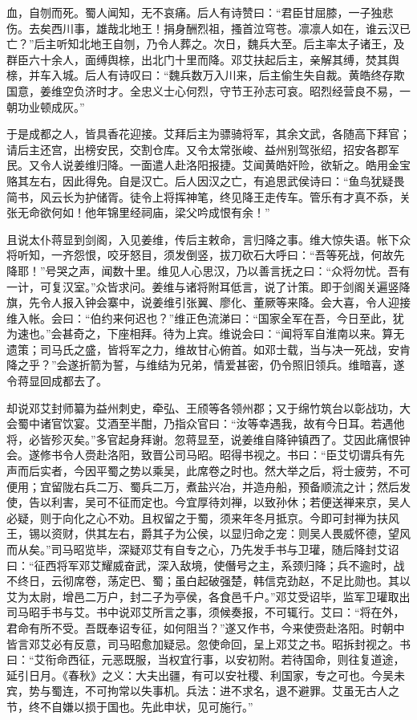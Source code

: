 血，自刎而死。蜀人闻知，无不哀痛。后人有诗赞曰：“君臣甘屈膝，一子独悲伤。去矣西川事，雄哉北地王！捐身酬烈祖，搔首泣穹苍。凛凛人如在，谁云汉已亡？”后主听知北地王自刎，乃令人葬之。次日，魏兵大至。后主率太子诸王，及群臣六十余人，面缚舆榇，出北门十里而降。邓艾扶起后主，亲解其缚，焚其舆榇，并车入城。后人有诗叹曰：“魏兵数万入川来，后主偷生失自裁。黄皓终存欺国意，姜维空负济时才。全忠义士心何烈，守节王孙志可哀。昭烈经营良不易，一朝功业顿成灰。”

于是成都之人，皆具香花迎接。艾拜后主为骠骑将军，其余文武，各随高下拜官；请后主还宫，出榜安民，交割仓库。又令太常张峻、益州别驾张绍，招安各郡军民。又令人说姜维归降。一面遣人赴洛阳报捷。艾闻黄皓奸险，欲斩之。皓用金宝赂其左右，因此得免。自是汉亡。后人因汉之亡，有追思武侯诗曰：“鱼鸟犹疑畏简书，风云长为护储胥。徒令上将挥神笔，终见降王走传车。管乐有才真不忝，关张无命欲何如！他年锦里经祠庙，梁父吟成恨有余！”

且说太仆蒋显到剑阁，入见姜维，传后主敕命，言归降之事。维大惊失语。帐下众将听知，一齐怨恨，咬牙怒目，须发倒竖，拔刀砍石大呼曰：“吾等死战，何故先降耶！”号哭之声，闻数十里。维见人心思汉，乃以善言抚之曰：“众将勿忧。吾有一计，可复汉室。”众皆求问。姜维与诸将附耳低言，说了计策。即于剑阁关遍竖降旗，先令人报入钟会寨中，说姜维引张翼、廖化、董厥等来降。会大喜，令人迎接维入帐。会曰：“伯约来何迟也？”维正色流涕曰：“国家全军在吾，今日至此，犹为速也。”会甚奇之，下座相拜。待为上宾。维说会曰：“闻将军自淮南以来。算无遗策；司马氏之盛，皆将军之力，维故甘心俯首。如邓士载，当与决一死战，安肯降之乎？”会遂折箭为誓，与维结为兄弟，情爱甚密，仍令照旧领兵。维暗喜，遂令蒋显回成都去了。

却说邓艾封师纂为益州刺史，牵弘、王颀等各领州郡；又于绵竹筑台以彰战功，大会蜀中诸官饮宴。艾酒至半酣，乃指众官曰：“汝等幸遇我，故有今日耳。若遇他将，必皆殄灭矣。”多官起身拜谢。忽蒋显至，说姜维自降钟镇西了。艾因此痛恨钟会。遂修书令人赍赴洛阳，致晋公司马昭。昭得书视之。书曰：“臣艾切谓兵有先声而后实者，今因平蜀之势以乘吴，此席卷之时也。然大举之后，将士疲劳，不可便用；宜留陇右兵二万、蜀兵二万，煮盐兴冶，并造舟船，预备顺流之计；然后发使，告以利害，吴可不征而定也。今宜厚待刘禅，以致孙休；若便送禅来京，吴人必疑，则于向化之心不劝。且权留之于蜀，须来年冬月抵京。今即可封禅为扶风王，锡以资财，供其左右，爵其子为公侯，以显归命之宠：则吴人畏威怀德，望风而从矣。”司马昭览毕，深疑邓艾有自专之心，乃先发手书与卫瓘，随后降封艾诏曰：“征西将军邓艾耀威奋武，深入敌境，使僭号之主，系颈归降；兵不逾时，战不终日，云彻席卷，荡定巴、蜀；虽白起破强楚，韩信克劲赵，不足比勋也。其以艾为太尉，增邑二万户，封二子为亭侯，各食邑千户。”邓艾受诏毕，监军卫瓘取出司马昭手书与艾。书中说邓艾所言之事，须候奏报，不可辄行。艾曰：“将在外，君命有所不受。吾既奉诏专征，如何阻当？”遂又作书，今来使赍赴洛阳。时朝中皆言邓艾必有反意，司马昭愈加疑忌。忽使命回，呈上邓艾之书。昭拆封视之。书曰：“艾衔命西征，元恶既服，当权宜行事，以安初附。若待国命，则往复道途，延引日月。《春秋》之义：大夫出疆，有可以安社稷、利国家，专之可也。今吴未宾，势与蜀连，不可拘常以失事机。兵法：进不求名，退不避罪。艾虽无古人之节，终不自嫌以损于国也。先此申状，见可施行。”


